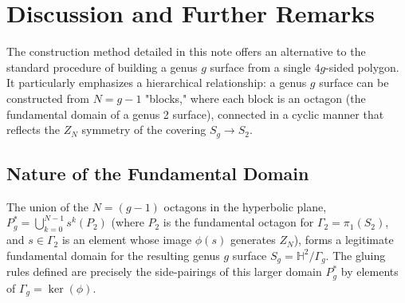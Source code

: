 \documentclass{article}
\theoremstyle{definition}
\theoremstyle{remark}
\begin{document}
\section{Discussion and Further Remarks}
The construction method detailed in this note offers an alternative to the standard procedure of building a genus $g$ surface from a single $4g$-sided polygon. It particularly emphasizes a hierarchical relationship: a genus $g$ surface can be constructed from $N=g-1$ "blocks," where each block is an octagon (the fundamental domain of a genus 2 surface), connected in a cyclic manner that reflects the $Z_N$ symmetry of the covering $S_g \to S_2$.

\subsection*{Nature of the Fundamental Domain} %
The union of the $N=(g-1)$ octagons in the hyperbolic plane, $P_g^* = \bigcup_{k=0}^{N-1} s^k(P_2)$ (where $P_2$ is the fundamental octagon for $\Gamma_2 = \pi_1(S_2)$, and $s \in \Gamma_2$ is an element whose image $\phi(s)$ generates $Z_N$), forms a legitimate fundamental domain for the resulting genus $g$ surface $S_g = \mathbb{H}^2/\Gamma_g$. The gluing rules defined are precisely the side-pairings of this larger domain $P_g^*$ by elements of $\Gamma_g = \ker(\phi)$.
\end{document}
